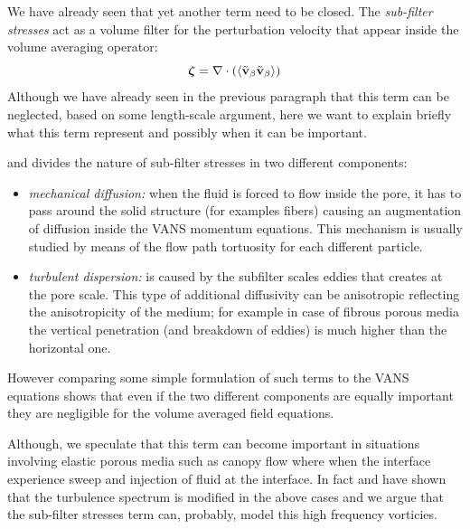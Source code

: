 We have already seen that yet another term need to be closed.
The \textit{sub-filter stresses} act as a volume filter for the perturbation velocity that appear inside the volume averaging operator:
$$\boldsymbol{\zeta} = \nabla \cdot \left({\left< \tilde{\textbf{v}}_{\beta} \tilde{\textbf{v}}_{\beta} \right>}\right)$$
Although we have already seen in the previous paragraph that this term can be neglected, based on some length-scale argument, here we want to explain briefly what this term represent and possibly when it can be important.

\citet{breugem2006influence} and \citet{nepf1999drag} divides the nature of sub-filter stresses in two different components:
\begin{itemize}
	\item \textit{mechanical diffusion:} when the fluid is forced to flow inside the pore, it has to pass around the solid structure (for examples fibers) causing an augmentation of diffusion inside the VANS momentum equations. This mechanism is usually studied by means of the flow path tortuosity for each different particle.
	\item \textit{turbulent dispersion:} is caused by the subfilter scales eddies that creates at the pore scale. This type of additional diffusivity can be anisotropic reflecting the anisotropicity of the medium; for example in case of fibrous porous media the vertical penetration (and breakdown of eddies) is much higher than the horizontal one.
\end{itemize}

However comparing some simple formulation of such terms to the VANS equations shows that even if the two different components are equally important they are negligible for the volume averaged field equations.

%

Although, we speculate that this term can become important in situations involving elastic porous media such as canopy flow where when the interface experience sweep and injection of fluid at the interface.
In fact \citet{finnigan2000turbulence} and \citet{de2008effects} have shown that the turbulence spectrum is modified in the above cases and we argue that the sub-filter stresses term can, probably, model this high frequency vorticies.

